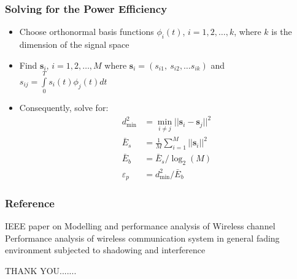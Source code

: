 \documentclass{beamer}
\begin{document}
{
  \frametitle{Solving for the Power Efficiency}

    \begin{itemize}
        \item Choose orthonormal basis functions $\phi_i(t)$, $i=1,2,\ldots,k$, where $k$ is the dimension of the signal space
        \item Find $\mathbf{s}_i$, $i=1,2,\ldots,M$ where $\mathbf{s}_i=(s_{i1},~s_{i2},\ldots{s_{ik}})$ and $s_{ij}=\int\limits_0^Ts_i(t)\phi_j(t)dt$
        \item Consequently, solve for:
        \begin{equation}
        \begin{split}
            d_{\min}^2&=\min\limits_{i\neq{j}}||{\mathbf{s}_i-\mathbf{s}_j}||^2\\
            \bar{E}_s&=\frac{1}{M}\sum\limits_{i=1}^{M}||\mathbf{s}_i||^2\\
            \bar{E}_b&=\bar{E}_s/\log_2(M)\\
            \varepsilon_p&=d_{\min}^2/\bar{E}_b\nonumber
        \end{split}
        \end{equation}
    \end{itemize}
}


\begin{frame}
\frametitle{Reference}
\footnotesize{
\begin{thebibliography}{99} %

\newblock IEEE paper on Modelling and performance analysis of Wireless channel
\newblock Performance analysis of wireless communication system in general fading environment subjected to shadowing and interference
\end{thebibliography}
}

\end{frame}


\begin{frame}
\Huge{\centerline{THANK YOU.......}}
\end{frame}

\end{document}
